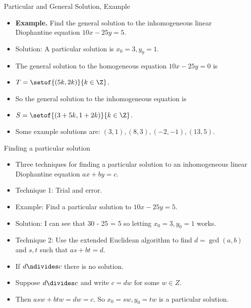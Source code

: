\documentclass{beamer}
\begin{document}
\begin{frame}{Particular and General Solution, Example}

\begin{itemize}
  \item \textbf{Example.} Find the general solution to the inhomogeneous linear Diophantine equation
  $10x - 25y = 5$.
  \item Solution: A particular solution is $x_0=3, y_0 = 1$.
  \item The general solution to the homogeneous equation $10x - 25y = 0$ is
  \item $T=\setof{(5k, 2k)}{k\in\Z}$.
  \item So the general solution to the inhomogeneous equation is
  \item $S = \setof{(3 + 5k, 1 + 2k)}{k\in\Z}$.
  \item Some example solutions are: $(3,1), (8,3), (-2, -1), (13, 5)$.
\end{itemize}
\end{frame}


\begin{frame}{Finding a particular solution}

\begin{itemize}
  \item Three techniques for finding a particular solution to an inhomogeneous linear Diophantine equation
  $ax+by=c$.
  \item Technique 1: Trial and error.
  \item Example: Find a particular solution to $10x - 25y = 5$.
  \item Solution: I can see that 30 - 25 = 5 so letting $x_0=3, y_0 = 1$ works.
  \item Technique 2: Use the extended Euclidean algorithm to find $d=\gcd(a,b)$
  and $s,t$ such that $as + bt = d$.
  \item If $d\ndivides c$ there is no solution.
  \item Suppose $d\divides c$ and write $c=d w$ for some $w\in Z$.
  \item Then $asw + btw = dw = c$. So $x_0 = sw, y_0 = tw$ is a particular solution.
\end{itemize}

\end{frame}

\end{document}
